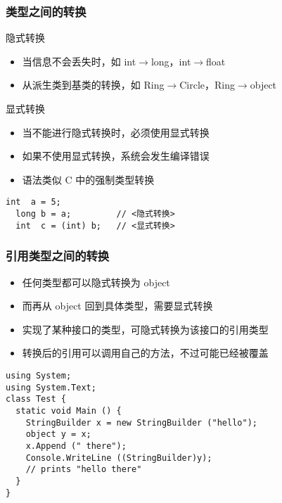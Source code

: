 \begin{frame}[fragile]
\frametitle{类型之间的转换}
\begin{block}{隐式转换}
  \begin{itemize}
  \item 当信息不会丢失时，如 int$\rightarrow$long，int$\rightarrow$float
  \item 从派生类到基类的转换，如 Ring$\rightarrow$Circle，Ring$\rightarrow$object
  \end{itemize}
\end{block}

\begin{block}{显式转换}
  \begin{itemize}
  \item 当不能进行隐式转换时，必须使用显式转换
  \item 如果不使用显式转换，系统会发生编译错误
  \item 语法类似 C 中的强制类型转换
  \end{itemize}
\end{block}

\begin{lstlisting}[escapeinside=<>]
  int  a = 5;
  long b = a;         // <隐式转换>
  int  c = (int) b;   // <显式转换>

\end{lstlisting}
\end{frame}

\begin{frame}[fragile]
\frametitle{引用类型之间的转换}
\begin{itemize}
\item 任何类型都可以隐式转换为 object
\item 而再从 object 回到具体类型，需要显式转换
\item 实现了某种接口的类型，可隐式转换为该接口的引用类型
\item 转换后的引用可以调用自己的方法，不过可能已经被覆盖
\end{itemize}
\begin{lstlisting}
using System;
using System.Text;
class Test {
  static void Main () {
    StringBuilder x = new StringBuilder ("hello");
    object y = x;
    x.Append (" there");
    Console.WriteLine ((StringBuilder)y);
    // prints "hello there"
  }
}
\end{lstlisting}
\end{frame}

